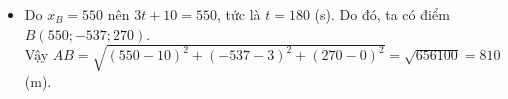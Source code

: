 \begin{bt}
{\begin{itemize}
			Suy ra $\left|\overrightarrow{AM}\right|=k\left|\overrightarrow{u}\right|=k\cdot\sqrt{2^2+(-2)^2+1^2}=3k$. Do đó $3k=4{,}5t\Leftrightarrow k=\dfrac{3t}{2}$. \\
			Vì thế, ta có $\overrightarrow{AM}=\dfrac{3t}{2}\overrightarrow{u}=\left(3t;-3t;\dfrac{3t}{2}\right)$.\\
			Gọi tọa độ của điểm $M$ là $(x_M;y_M;z_M)$.\\
			Do $\overrightarrow{AM}=(x_M-x_A;y_M-y_A;z_M-z_A)=\left(3t;-3t;\dfrac{3t}{2}\right)$ nên $$\heva{&x_M=3t+x_A\\&y_M=-3t+y_A\\&z_M=\dfrac{3t}{2}+z_A}\Leftrightarrow\heva{&x_M=3t+10\\&y_M=-3t+3\\&z_M=\dfrac{3t}{2}.}$$
			Vậy điểm $M$ có tọa độ là $\left(3t+10;-3t+3;\dfrac{3t}{2}\right)$.
			\item Do $x_B=550$ nên $3t+10=550$, tức là $t=180$ (s). Do đó, ta có điểm $B(550;-537;270)$.\\
			Vậy $AB=\sqrt{(550-10)^2+(-537-3)^2+(270-0)^2}=\sqrt{656100}=810$ (m).
		\end{itemize}
	}
\end{bt}

